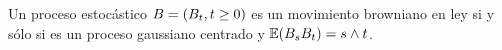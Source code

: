 \begin{problema}
	Un proceso estoc\'astico $B=\left( B_t,t\geq 0\right) $ es un movimiento 
	browniano en ley si y s\'olo si es un proceso gaussiano centrado y $\mathbb{E}\! \left( B_sB_t \right)=s\wedge t$. 
\end{problema}